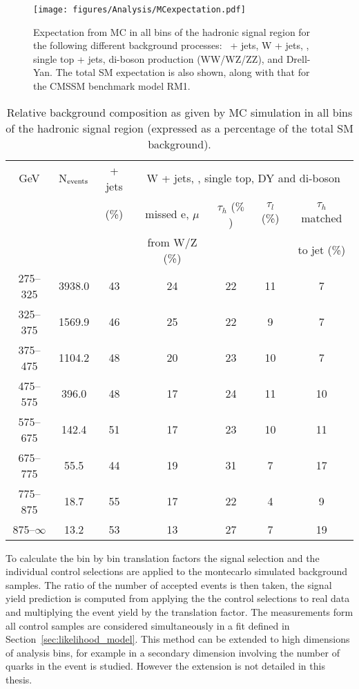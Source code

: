 \begin{figure}[ht|]
  \centering
    \texttt{[image: figures/Analysis/MCexpectation.pdf]}
  \caption{Expectation from MC in all bins of the hadronic signal
      region for the following different background processes: \HepProcess{\PZ\to\nu\nu}\
      + jets, W + jets, \HepProcess{\Ptop\APtop}, single top + jets, di-boson production
      (WW/WZ/ZZ), and Drell-Yan. The total SM expectation is also
      shown, along with that for the CMSSM benchmark model RM1.}
  \label{fig:figures_Analysis_MCexpectation}
\end{figure}

\begin{table}[th|]
  \caption{Relative background composition as given by MC simulation
    in all bins of the hadronic signal region (expressed as a
    percentage of the total SM background).} 
  \label{tab:bg-compositions}
  \centering
  \begin{tabular}{ |c|c|c|c|c|c|c| }
    \hline
    \HT GeV & N$_{\rm events}$ & \HepProcess{\PZ\to\nu\nu} + jets & \multicolumn{4}{c}{W + jets, \HepProcess{\Ptop\APtop}, single top, DY and di-boson}  \\ [0.5ex]
    \cline{4-7}
    &                & (\%)           & missed e, $\mu$ & $\tau_{h}$ ($\%$) & $\tau_{l}$ (\%) & $\tau_{h}$ matched \\
    &                &                & from W/Z (\%)   &               &               & to jet (\%)      \\ [0.5ex]
    \hline
    275--325      & 3938.0 & 43 & 24 & 22 & 11 & 7  \\ 
    325--375      & 1569.9 & 46 & 25 & 22 & 9  & 7  \\ 
    375--475      & 1104.2 & 48 & 20 & 23 & 10 & 7  \\ 
    475--575      & 396.0  & 48 & 17 & 24 & 11 & 10 \\ 
    575--675      & 142.4  & 51 & 17 & 23 & 10 & 11 \\ 
    675--775      & 55.5   & 44 & 19 & 31 & 7  & 17 \\ 
    775--875      & 18.7   & 55 & 17 & 22 & 4  & 9  \\ 
    875--$\infty$ & 13.2   & 53 & 13 & 27 & 7  & 19 \\ 
    \hline
  \end{tabular}
\end{table}

To calculate the bin by bin translation factors the signal selection and the 
individual control selections are applied to the montecarlo simulated 
background samples. The ratio of the number of accepted events is then taken, 
the signal yield prediction is computed from applying the the control 
selections to real data and multiplying the event yield by the translation 
factor. The measurements form all control samples are considered simultaneously 
in a fit defined in Section~\ref{sec:likelihood_model}. This method can be 
extended to high dimensions of analysis bins, for example in 
\cite{CMS-PAS-SUS-12-028} a secondary dimension involving the number 
of \HepProcess{\PB} quarks in the event is studied. However the 
\HepProcess{\PB} extension is not detailed in this thesis.

